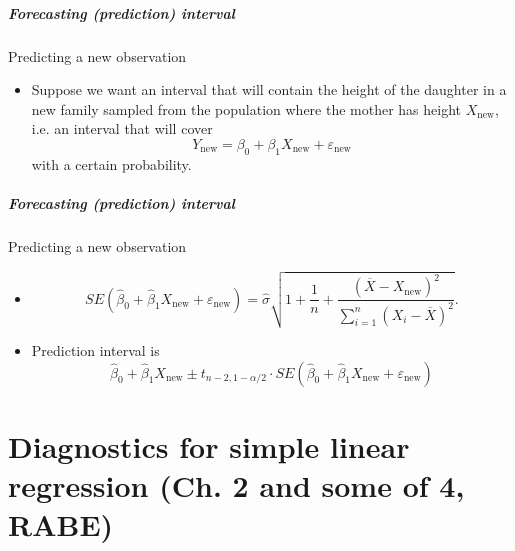 \documentclass[handout]{beamer}
\begin{document}

   \begin{frame} \frametitle{Forecasting (prediction) interval}

   \begin{block}
   {Predicting a new observation}
   \begin{itemize}[<+->]

   \item Suppose we want an interval that will contain
   the height of the daughter in a new family sampled from the population
   where the mother has height $X_{\text{new}}$, i.e. an
   interval that will cover
   $$
   Y_{\text{new}} = \beta_0 + \beta_1 X_{\text{new}} + \varepsilon_{\text{new}}$$
   with a certain probability.
   \end{itemize}
   \end{block}
   \end{frame}


   \begin{frame} \frametitle{Forecasting (prediction) interval}

   \begin{block}
   {Predicting a new observation}
   \begin{itemize}[<+->]

   \item
   $$
   SE(\widehat{\beta}_0 + \widehat{\beta}_1 X_{\text{new}} + \varepsilon_{\text{new}}) = \widehat{\sigma} \sqrt{1 + \frac{1}{n} + \frac{(\overline{X} - X_{\text{new}})^2}{\sum_{i=1}^n \left(X_i-\overline{X}\right)^2}}.$$

   \item Prediction interval  is
   $$ \widehat{\beta}_0 +  \widehat{\beta}_1 X_{\text{new}} \pm t_{n-2, 1-\alpha/2} \cdot SE(\widehat{\beta}_0 + \widehat{\beta}_1 X_{\text{new}} + \varepsilon_{\text{new}})
   $$
   \end{itemize}
   \end{block}
   \end{frame}

   \part{Diagnostics for simple linear regression  (Ch. 2 and some of 4, RABE)}
   \frame{\partpage}

\end{document}
